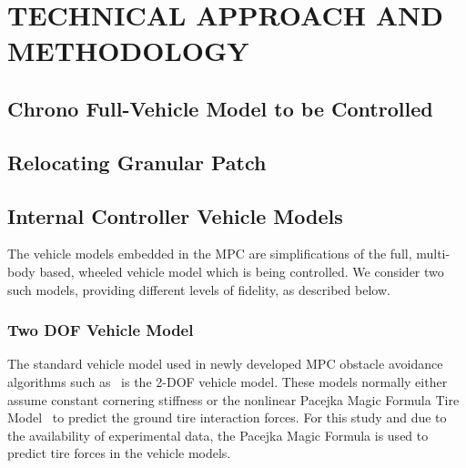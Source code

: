 \documentclass[12pt,twocolumn]{article}
\newcommand{\CHRONO}{{\sffamily{{Chrono}}}}
\begin{document}

\section{TECHNICAL APPROACH AND METHODOLOGY}\label{s:methodology}

\subsection{Chrono Full-Vehicle Model to be Controlled}\label{ss:FullVehicleModel}



\subsection{Relocating Granular Patch }\label{ss:Patch}


\subsection{Internal Controller Vehicle Models}\label{ss:IntModel}

The vehicle models embedded in the MPC are simplifications of the full, multi-body based, \CHRONO wheeled vehicle model which is being controlled.  We consider two such models, providing different levels of fidelity, as described below.


\subsubsection{Two DOF Vehicle Model}\label{sss:2DOFModel}
The standard vehicle model used in newly developed MPC obstacle avoidance algorithms such as~\cite{foo} is the 2-DOF vehicle model. These models normally either assume constant cornering stiffness or the nonlinear Pacejka Magic Formula Tire Model~\cite{foo} to predict the ground tire interaction forces. For this study and due to the availability of experimental data, the Pacejka Magic Formula is used to predict tire forces in the vehicle models.   
\end{document}
